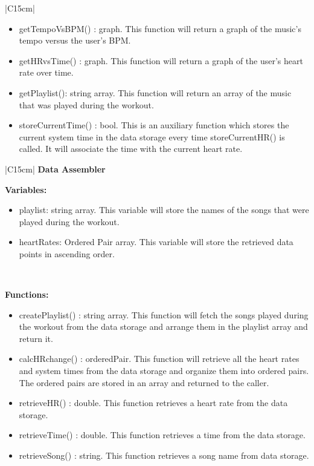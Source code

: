 \documentclass[letterpaper,english, 12pt]{scrreprt}
\begin{document}
\begin{center}
\begin{tabular}{|C{15cm}|}
\begin{itemize}
					\item getTempoVsBPM() : graph. This function will return a graph of the music's tempo versus the user's BPM.
					\item getHRvsTime() : graph. This function will return a graph of the user's heart rate over time.
					\item getPlaylist(): string array. This function will return an array of the music that was played during the workout.
					\item storeCurrentTime() : bool. This is an auxiliary function which stores the current system time in the data storage every time storeCurrentHR() is called. It will associate the time with the current heart rate.
				\end{itemize}
			\hline
	\end{tabular}
\end{center}


\begin{center}
	\begin{tabular}{|C{15cm}|}
		\hline
			\textbf{Data Assembler} \\
		\hline
			\begin{flushleft}
				\textbf{Variables:} \\
			\end{flushleft}
				\begin{itemize}
					\item playlist: string array. This variable will store the names of the songs that were played during the workout.
					\item heartRates: Ordered Pair array. This variable will store the retrieved data points in ascending order.
				\end{itemize} \\
			\hline
			\begin{flushleft}
				\textbf{Functions: } \\
			\end{flushleft}
				\begin{itemize}
					\item createPlaylist() : string array. This function will fetch the songs played during the workout from the data storage and arrange them in the playlist array and return it.
					\item calcHRchange() : orderedPair. This function will retrieve all the heart rates and system times from the data storage and organize them into ordered pairs. The ordered pairs are stored in an array and returned to the caller.
					\item retrieveHR() : double. This function retrieves a heart rate from the data storage.
					\item retrieveTime() : double. This function retrieves a time from the data storage.
					\item retrieveSong() : string. This function retrieves a song name from data storage.
				\end{itemize}
			\hline
	\end{tabular}
\end{center}
\end{document}
